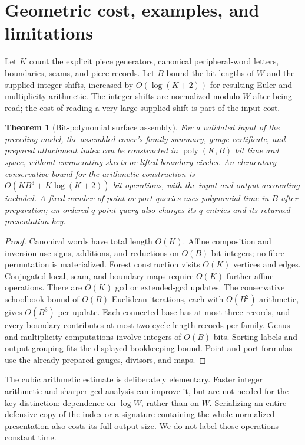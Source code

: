 \documentclass[11pt,a4paper]{article}
\newtheorem{theorem}{Theorem}[section]
\theoremstyle{definition}\newtheorem{definition}[theorem]{Definition}
\theoremstyle{remark}\newtheorem{remark}[theorem]{Remark}
\newcommand{\poly}{\operatorname{poly}}
\begin{document}
\section{Geometric cost, examples, and limitations}
\label{sec:geometric-cost}

Let $K$ count the explicit piece generators, canonical peripheral-word
letters, boundaries, seams, and piece records. Let $B$ bound the bit lengths
of $W$ and the supplied integer shifts, increased by
$O(\log(K+2))$ for resulting Euler and multiplicity arithmetic.
The integer shifts are normalized modulo $W$ after being read; the cost of
reading a very large supplied shift is part of the input cost.

\begin{theorem}[Bit-polynomial surface assembly]\label{thm:assemblycost}
For a validated input of the preceding model, the assembled cover's family
summary, gauge certificate, and prepared attachment index can be constructed
in $\poly(K,B)$ bit time and space, without enumerating sheets or lifted
boundary circles. An elementary conservative bound for the arithmetic
construction is $O(KB^3+K\log(K+2))$ bit operations, with the input and
output accounting included. A fixed number of point or port queries uses
polynomial time in $B$ after preparation; an ordered $q$-point query also
charges its $q$ entries and its returned presentation key.
\end{theorem}
\begin{proof}
Canonical words have total length $O(K)$. Affine composition and inversion
use signs, additions, and reductions on $O(B)$-bit integers; no fibre
permutation is materialized. Forest construction visits $O(K)$ vertices and
edges. Conjugated local, seam, and boundary maps require $O(K)$ further
affine operations. There are $O(K)$ gcd or extended-gcd updates. The
conservative schoolbook bound of $O(B)$ Euclidean iterations, each with
$O(B^2)$ arithmetic, gives $O(B^3)$ per update. Each connected base has at
most three records, and every boundary contributes at most two cycle-length
records per family. Genus and multiplicity computations involve integers of
$O(B)$ bits. Sorting labels and output grouping fits the displayed
bookkeeping bound. Point and port formulas use the already prepared gauges,
divisors, and maps.
\end{proof}

The cubic arithmetic estimate is deliberately elementary. Faster integer
arithmetic and sharper gcd analysis can improve it, but are not needed for
the key distinction: dependence on $\log W$, rather than on $W$. Serializing
an entire defensive copy of the index or a signature containing the whole
normalized presentation also costs its full output size. We do not label
those operations constant time.
\end{document}
